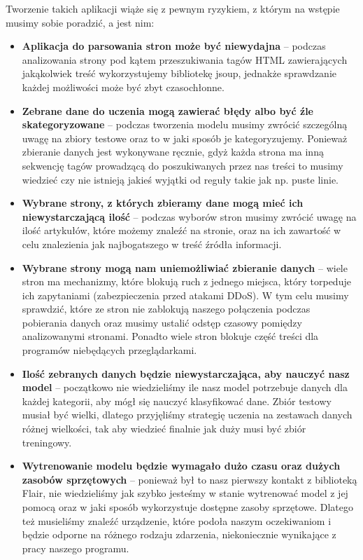 Tworzenie takich aplikacji wiąże się z pewnym ryzykiem, z którym na wstępie musimy sobie poradzić, a jest nim:
\begin{itemize}[label=\textbullet]
\item \textbf{Aplikacja do parsowania stron może być niewydajna} – podczas analizowania strony pod kątem przeszukiwania tagów HTML zawierających jakąkolwiek treść wykorzystujemy bibliotekę jsoup, jednakże sprawdzanie każdej możliwości może być zbyt czasochłonne.

\item \textbf{Zebrane dane do uczenia mogą zawierać błędy albo być źle skategoryzowane} – podczas tworzenia modelu musimy zwrócić szczególną uwagę na zbiory testowe oraz to w jaki sposób je kategoryzujemy. Ponieważ zbieranie danych jest wykonywane ręcznie, gdyż każda strona ma inną sekwencję tagów prowadzącą do poszukiwanych przez nas treści to musimy wiedzieć czy nie istnieją jakieś wyjątki od reguły takie jak np. puste linie.

\item \textbf{Wybrane strony, z których zbieramy dane mogą mieć ich niewystarczającą ilość} – podczas wyborów stron musimy zwrócić uwagę na ilość artykułów, które możemy znaleźć na stronie, oraz na ich zawartość w celu znalezienia jak najbogatszego w treść źródła informacji.

\item \textbf{Wybrane strony mogą nam uniemożliwiać zbieranie danych} – wiele stron ma mechanizmy, które blokują ruch z jednego miejsca, który torpeduje ich zapytaniami (zabezpieczenia przed atakami DDoS). W tym celu musimy sprawdzić, które ze stron nie zablokują naszego połączenia podczas pobierania danych oraz musimy ustalić odstęp czasowy pomiędzy analizowanymi stronami. Ponadto wiele stron blokuje część treści dla programów niebędących przeglądarkami.

\item \textbf{Ilość zebranych danych będzie niewystarczająca, aby nauczyć nasz model} – początkowo nie wiedzieliśmy ile nasz model potrzebuje danych dla każdej kategorii, aby mógł się nauczyć klasyfikować dane. Zbiór testowy musiał być wielki, dlatego przyjęliśmy strategię uczenia na zestawach danych różnej wielkości, tak aby wiedzieć finalnie jak duży musi być zbiór treningowy.

\item \textbf{Wytrenowanie modelu będzie wymagało dużo czasu oraz dużych zasobów sprzętowych} – ponieważ był to nasz pierwszy kontakt z biblioteką Flair, nie wiedzieliśmy jak szybko jesteśmy w stanie wytrenować model z jej pomocą oraz w jaki sposób wykorzystuje dostępne zasoby sprzętowe. Dlatego też musieliśmy znaleźć urządzenie, które podoła naszym oczekiwaniom i będzie odporne na różnego rodzaju zdarzenia, niekoniecznie wynikające z pracy naszego programu.


\end{itemize}
